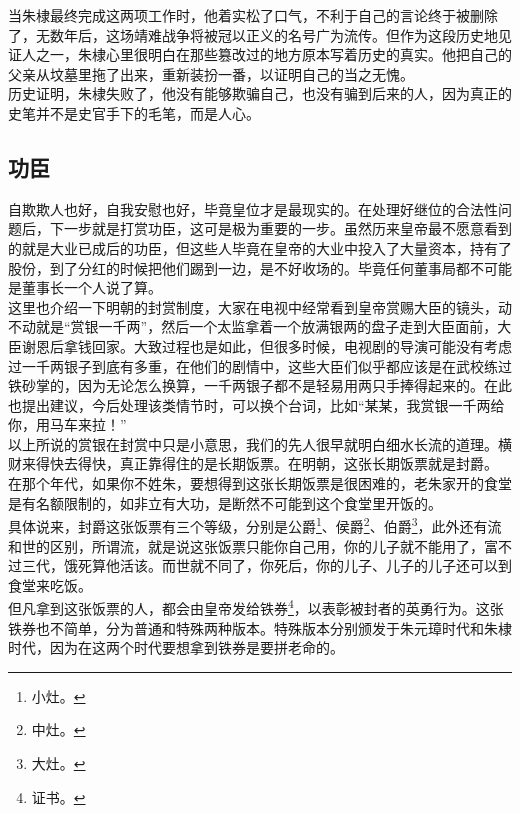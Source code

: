 \begin{multicols}{\theparacolNo}
当朱棣最终完成这两项工作时，他着实松了口气，不利于自己的言论终于被删除了，无数年后，这场靖难战争将被冠以正义的名号广为流传。但作为这段历史地见证人之一，朱棣心里很明白在那些篡改过的地方原本写着历史的真实。他把自己的父亲从坟墓里拖了出来，重新装扮一番，以证明自己的当之无愧。\\

历史证明，朱棣失败了，他没有能够欺骗自己，也没有骗到后来的人，因为真正的史笔并不是史官手下的毛笔，而是人心。\\

\subsection{功臣}
自欺欺人也好，自我安慰也好，毕竟皇位才是最现实的。在处理好继位的合法性问题后，下一步就是打赏功臣，这可是极为重要的一步。虽然历来皇帝最不愿意看到的就是大业已成后的功臣，但这些人毕竟在皇帝的大业中投入了大量资本，持有了股份，到了分红的时候把他们踢到一边，是不好收场的。毕竟任何董事局都不可能是董事长一个人说了算。\\

这里也介绍一下明朝的封赏制度，大家在电视中经常看到皇帝赏赐大臣的镜头，动不动就是“赏银一千两”，然后一个太监拿着一个放满银两的盘子走到大臣面前，大臣谢恩后拿钱回家。大致过程也是如此，但很多时候，电视剧的导演可能没有考虑过一千两银子到底有多重，在他们的剧情中，这些大臣们似乎都应该是在武校练过铁砂掌的，因为无论怎么换算，一千两银子都不是轻易用两只手捧得起来的。在此也提出建议，今后处理该类情节时，可以换个台词，比如“某某，我赏银一千两给你，用马车来拉！”\\

以上所说的赏银在封赏中只是小意思，我们的先人很早就明白细水长流的道理。横财来得快去得快，真正靠得住的是长期饭票。在明朝，这张长期饭票就是封爵。\\

在那个年代，如果你不姓朱，要想得到这张长期饭票是很困难的，老朱家开的食堂是有名额限制的，如非立有大功，是断然不可能到这个食堂里开饭的。\\

具体说来，封爵这张饭票有三个等级，分别是公爵\footnote{小灶。}、侯爵\footnote{中灶。}、伯爵\footnote{大灶。}，此外还有流和世的区别，所谓流，就是说这张饭票只能你自己用，你的儿子就不能用了，富不过三代，饿死算他活该。而世就不同了，你死后，你的儿子、儿子的儿子还可以到食堂来吃饭。\\

但凡拿到这张饭票的人，都会由皇帝发给铁券\footnote{证书。}，以表彰被封者的英勇行为。这张铁券也不简单，分为普通和特殊两种版本。特殊版本分别颁发于朱元璋时代和朱棣时代，因为在这两个时代要想拿到铁券是要拼老命的。\\


\end{multicols}
